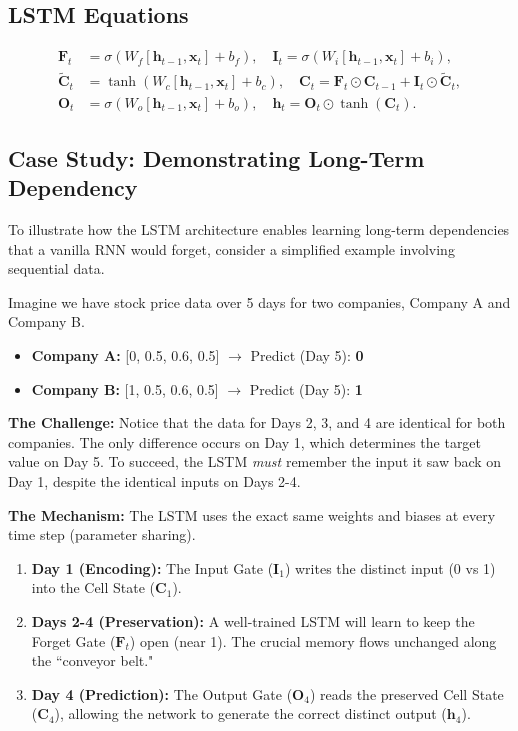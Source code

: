 \documentclass{article}
\begin{document}
\subsection{LSTM Equations}
\begin{align}
\mathbf{F}_t &= \sigma(W_f[\mathbf{h}_{t-1},\mathbf{x}_t]+b_f),\quad
\mathbf{I}_t = \sigma(W_i[\mathbf{h}_{t-1},\mathbf{x}_t]+b_i),\\
\tilde{\mathbf{C}}_t &= \tanh(W_c[\mathbf{h}_{t-1},\mathbf{x}_t]+b_c),\quad
\mathbf{C}_t = \mathbf{F}_t \odot \mathbf{C}_{t-1} + \mathbf{I}_t \odot \tilde{\mathbf{C}}_t,\\
\mathbf{O}_t &= \sigma(W_o[\mathbf{h}_{t-1},\mathbf{x}_t]+b_o),\quad
\mathbf{h}_t = \mathbf{O}_t \odot \tanh(\mathbf{C}_t).
\end{align}

\subsection{Case Study: Demonstrating Long-Term Dependency}

To illustrate how the LSTM architecture enables learning long-term dependencies that a vanilla RNN would forget, consider a simplified example involving sequential data.

\begin{tcolorbox}[colback=blue!5!white, colframe=blue!60!black, title=Example: Stock Prediction with Distant Dependencies]
Imagine we have stock price data over 5 days for two companies, Company A and Company B.

\begin{itemize}
    \item \textbf{Company A:} [0, 0.5, 0.6, 0.5] $\to$ Predict (Day 5): \textbf{0}
    \item \textbf{Company B:} [1, 0.5, 0.6, 0.5] $\to$ Predict (Day 5): \textbf{1}
\end{itemize}

\textbf{The Challenge:} Notice that the data for Days 2, 3, and 4 are identical for both companies. The only difference occurs on Day 1, which determines the target value on Day 5. To succeed, the LSTM \emph{must} remember the input it saw back on Day 1, despite the identical inputs on Days 2-4.

\textbf{The Mechanism:} The LSTM uses the exact same weights and biases at every time step (parameter sharing).
\begin{enumerate}
    \item \textbf{Day 1 (Encoding):} The Input Gate ($\mathbf{I}_1$) writes the distinct input (0 vs 1) into the Cell State ($\mathbf{C}_1$).
    \item \textbf{Days 2-4 (Preservation):} A well-trained LSTM will learn to keep the Forget Gate ($\mathbf{F}_t$) open (near 1). The crucial memory flows unchanged along the ``conveyor belt."
    \item \textbf{Day 4 (Prediction):} The Output Gate ($\mathbf{O}_4$) reads the preserved Cell State ($\mathbf{C}_4$), allowing the network to generate the correct distinct output ($\mathbf{h}_4$).
\end{enumerate}
\end{tcolorbox}
\end{document}
